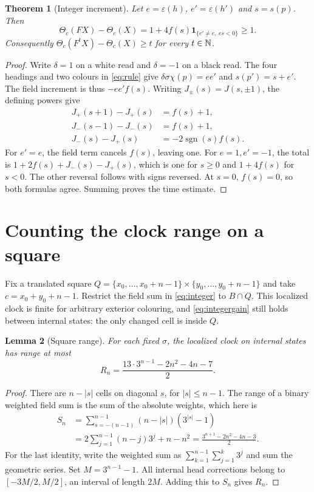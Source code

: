 \documentclass[11pt,a4paper]{article}
\newtheorem{theorem}{Theorem}[section]
\newtheorem{lemma}[theorem]{Lemma}
\theoremstyle{remark}\newtheorem{remark}[theorem]{Remark}
\newcommand{\eps}{\varepsilon}\newcommand{\symdiff}{\mathbin{\triangle}}
\begin{document}
\begin{theorem}[Integer increment]\label{thm:integerclock}
Let $e=\eps(h)$, $e'=\eps(h')$ and $s=s(p)$. Then
\begin{equation}\label{eq:integergain}
 \Theta_c(FX)-\Theta_c(X)
 =1+4f(s)\mathbf1_{\{e'\ne e,\ es<0\}}\ge1.
\end{equation}
Consequently $\Theta_c(F^tX)-\Theta_c(X)\ge t$ for every $t\in\mathbb N$.
\end{theorem}
\begin{proof}
Write $\delta=1$ on a white read and $\delta=-1$ on a black read.
The four headings and two colours in \eqref{eq:rule} give
$\delta\sigma\chi(p)=ee'$ and $s(p')=s+e'$.
The field increment is thus $-ee'f(s)$.
Writing $J_\pm(s)=J(s,\pm1)$, the defining powers give
\begin{align*}
 J_+(s+1)-J_+(s)&=f(s)+1,\\
 J_-(s-1)-J_-(s)&=f(s)+1,\\
 J_-(s)-J_+(s)&=-2\operatorname{sgn}(s)f(s).
\end{align*}
For $e'=e$, the field term cancels $f(s)$, leaving one.
For $e=1,e'=-1$, the total is
$1+2f(s)+J_-(s)-J_+(s)$, which is one for $s\ge0$ and
$1+4f(s)$ for $s<0$. The other reversal follows with signs reversed.
At $s=0$, $f(s)=0$, so both formulas agree. Summing proves the time estimate.
\end{proof}

\section{Counting the clock range on a square}
Fix a translated square
$Q=\{x_0,\ldots,x_0+n-1\}\times\{y_0,\ldots,y_0+n-1\}$ and take
$c=x_0+y_0+n-1$. Restrict the field sum in \eqref{eq:integer} to $B\cap Q$.
This localized clock is finite for arbitrary exterior colouring, and
\eqref{eq:integergain} still holds between internal states: the only changed
cell is inside $Q$.

\begin{lemma}[Square range]\label{lem:integerrange}
For each fixed $\sigma$, the localized clock on internal states has range
at most
\[
 R_n=\frac{13\cdot3^{n-1}-2n^2-4n-7}{2}.
\]
\end{lemma}
\begin{proof}
There are $n-|s|$ cells on diagonal $s$, for $|s|\le n-1$.
The range of a binary weighted field sum is the sum of the absolute weights,
which here is
\begin{align*}
 S_n&=\sum_{s=-(n-1)}^{n-1}(n-|s|)(3^{|s|}-1)\\
 &=2\sum_{j=1}^{n-1}(n-j)3^j+n-n^2
   =\frac{3^{n+1}-2n^2-4n-3}{2}.
\end{align*}
For the last identity, write the weighted sum as
$\sum_{k=1}^{n-1}\sum_{j=1}^k3^j$ and sum the geometric series.
Set $M=3^{n-1}-1$. All internal head corrections belong to
$[-3M/2,M/2]$, an interval of length $2M$. Adding this to $S_n$ gives $R_n$.
\end{proof}
\end{document}
